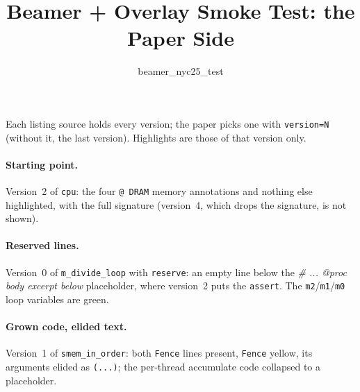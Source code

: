 \documentclass{article}
\title{Beamer + Overlay Smoke Test: the Paper Side}
\author{beamer\_nyc25\_test}
\date{}
\begin{document}
\maketitle


Each listing source holds every version; the paper picks one with \texttt{version=N}
(without it, the last version). Highlights are those of that version only.

\paragraph{Starting point.}
Version~2 of \texttt{cpu}: the four \texttt{@ DRAM} memory annotations and nothing else highlighted,
with the full signature (version~4, which drops the signature, is not shown).
\begin{center}
\begin{minipage}{0.7\linewidth}
\end{minipage}
\end{center}

\paragraph{Reserved lines.}
Version~0 of \texttt{m\_divide\_loop} with \texttt{reserve}: an empty line below the
\textit{\# ... @proc body excerpt below} placeholder, where version~2 puts the \texttt{assert}.
The \texttt{m2}/\texttt{m1}/\texttt{m0} loop variables are green.
\begin{center}
\begin{minipage}{0.7\linewidth}
\small
{}
\end{minipage}
\end{center}

\paragraph{Grown code, elided text.}
Version~1 of \texttt{smem\_in\_order}: both \texttt{Fence} lines present, \texttt{Fence} yellow,
its arguments elided as \texttt{(...)}; the per-thread accumulate code collapsed to a placeholder.
\begin{center}
\begin{minipage}{0.9\linewidth}
\small
{}
\end{minipage}
\end{center}
\end{document}

